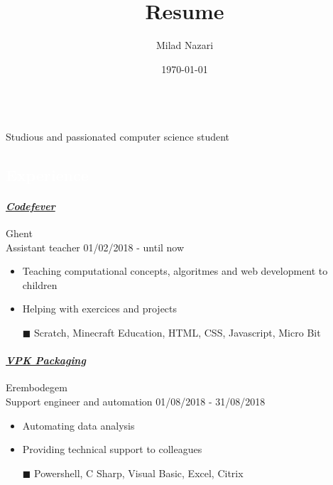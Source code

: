 \documentclass[a4paper, twoside]{article}
\title{Resume}
\author{ Milad Nazari }
\date{\today}
\begin{document}
\begin{multicols}{2}
\\
\noindent Studious and passionated computer science student
\paragraph{}
\hfill{}\par
\hfill{}\par
\hfill{}\par
\end{multicols}
\begin{mdframed}
\section*{\textcolor{white}{ Experience }}
\end{mdframed}
\paragraph{\textbf{\textit{\href{https://codefever.be }{\textcolor{blueDark}{ Codefever }}}}} \hfill\small Ghent \\
Assistant teacher \hfill\small 01/02/2018 - until now
\begin{itemize}
\itemsep-0.2em
\item Teaching computational concepts, algoritmes and web development to children
\item Helping with exercices and projects
\item[\color{orange}$\blacksquare$] Scratch, Minecraft Education, HTML, CSS, Javascript, Micro Bit
\end{itemize}
\paragraph{\textbf{\textit{\href{https://vpkgroup.com }{\textcolor{blueDark}{ VPK Packaging }}}}} \hfill\small Erembodegem \\
Support engineer and automation \hfill\small 01/08/2018 - 31/08/2018
\begin{itemize}
\itemsep-0.2em
\item Automating data analysis
\item Providing technical support to colleagues
\item[\color{orange}$\blacksquare$] Powershell, C Sharp, Visual Basic, Excel, Citrix
\end{itemize}
\end{document}
